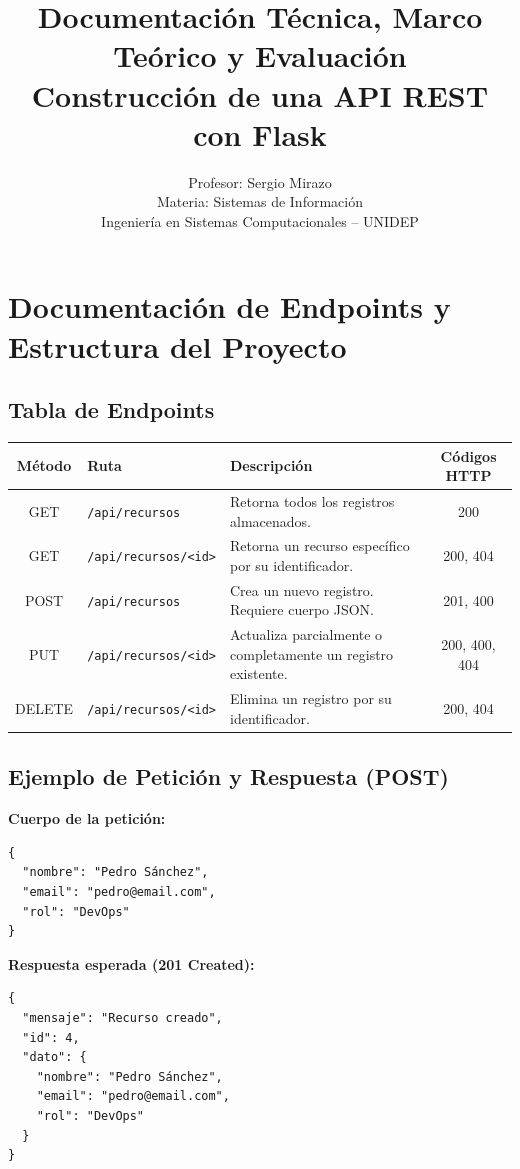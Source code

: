\documentclass[12pt,a4paper]{article}
\title{\textbf{Documentación Técnica, Marco Teórico y Evaluación}\\
\large Construcción de una API REST con Flask}
\author{Profesor: Sergio Mirazo \\ Materia: Sistemas de Información\\
Ingeniería en Sistemas Computacionales -- UNIDEP}
\date{}
\begin{document}
\maketitle
\thispagestyle{empty}

\section*{Documentación de Endpoints y Estructura del Proyecto}

\subsection*{Tabla de Endpoints}
\begin{table}[h]
\centering
\renewcommand{\arraystretch}{1.3}
\begin{tabular}{|c|l|p{6cm}|c|}
\hline
\textbf{Método} & \textbf{Ruta} & \textbf{Descripción} & \textbf{Códigos HTTP} \\ \hline
GET    & \verb|/api/recursos|          & Retorna todos los registros almacenados.        & 200 \\ \hline
GET    & \verb|/api/recursos/<id>|     & Retorna un recurso específico por su identificador. & 200, 404 \\ \hline
POST   & \verb|/api/recursos|          & Crea un nuevo registro. Requiere cuerpo JSON.   & 201, 400 \\ \hline
PUT    & \verb|/api/recursos/<id>|     & Actualiza parcialmente o completamente un registro existente. & 200, 400, 404 \\ \hline
DELETE & \verb|/api/recursos/<id>|     & Elimina un registro por su identificador.       & 200, 404 \\ \hline
\end{tabular}
\end{table}

\subsection*{Ejemplo de Petición y Respuesta (POST)}
\textbf{Cuerpo de la petición:}
\begin{verbatim}
{
  "nombre": "Pedro Sánchez",
  "email": "pedro@email.com",
  "rol": "DevOps"
}
\end{verbatim}

\textbf{Respuesta esperada (201 Created):}
\begin{verbatim}
{
  "mensaje": "Recurso creado",
  "id": 4,
  "dato": {
    "nombre": "Pedro Sánchez",
    "email": "pedro@email.com",
    "rol": "DevOps"
  }
}
\end{verbatim}
\end{document}
